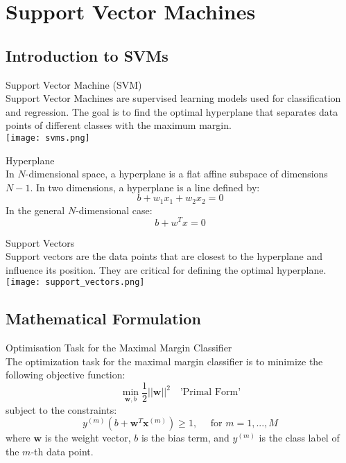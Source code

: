 \section{Support Vector Machines}

\subsection{Introduction to SVMs}

\begin{definition}{Support Vector Machine (SVM)}\\
Support Vector Machines are supervised learning models used for classification and regression. The goal is to find the optimal hyperplane that separates data points of different classes with the maximum margin.\\
    \texttt{[image: svms.png]}
\end{definition}

\begin{definition}{Hyperplane}\\
In $N$-dimensional space, a hyperplane is a flat affine subspace of dimensions $N-1$. In two dimensions, a hyperplane is a line defined by:
\[b + w_1 x_1 + w_2 x_2 = 0\]
In the general $N$-dimensional case:
\[b + w^T x = 0\]
\end{definition}

\begin{definition}{Support Vectors}\\
    Support vectors are the data points that are closest to the hyperplane and influence its position. They are critical for defining the optimal hyperplane.\\
    \texttt{[image: support\_vectors.png]}
\end{definition}

\subsection{Mathematical Formulation}

\begin{concept}{Optimisation Task for the Maximal Margin Classifier}\\
    The optimization task for the maximal margin classifier is to minimize the following objective function:
    \[ \min_{\mathbf{w}, b} \frac{1}{2} ||\mathbf{w}||^2 \quad \text{'Primal Form'}\]
    subject to the constraints:
    \[ y^{(m)} (b + \mathbf{w}^T \mathbf{x}^{(m)}) \geq 1, \quad \text{ for } m = 1,..., M \]
    where $\mathbf{w}$ is the weight vector, $b$ is the bias term, and $y^{(m)}$ is the class label of the $m$-th data point.
\end{concept}

